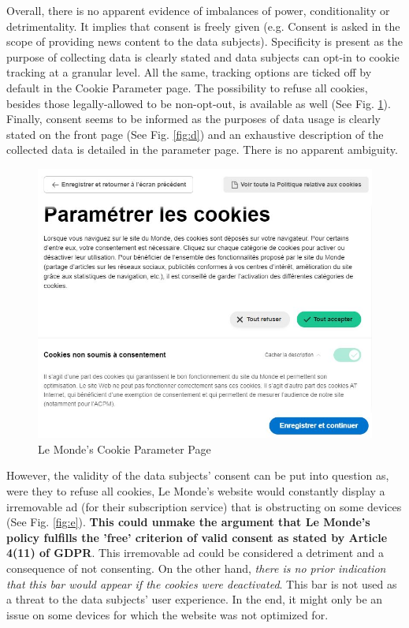 \documentclass[twocolumn, letterpaper]{scrartcl}
\begin{document}
    	Overall, there is no apparent evidence of imbalances of power, conditionality or detrimentality. It implies that consent is freely given (e.g. Consent is asked in the scope of providing news content to the data subjects). Specificity is present as the purpose of collecting data is clearly stated and data subjects can opt-in to cookie tracking at a granular level. All the same, tracking options are ticked off by default in the Cookie Parameter page. The possibility to refuse all cookies, besides those legally-allowed to be non-opt-out, is available as well (See Fig. \ref{fig:c}). Finally, consent seems to be informed as the purposes of data usage is clearly stated on the front page (See Fig. \ref{fig:d}) and an exhaustive description of the collected data is detailed in the parameter page. There is no apparent ambiguity.
    	
    	\begin{figure}[tbp]	
            \includegraphics[width=0.9\linewidth]{lm_cn.JPG}
            \caption{Le Monde's Cookie Parameter Page \label{fig:c}}
        \end{figure}
        
    	However, the validity of the data subjects' consent can be put into question as, were they to refuse all cookies, Le Monde's website would constantly display a irremovable ad (for their subscription service) that is obstructing on some devices (See Fig. \ref{fig:e}). \textbf{This could unmake the argument that Le Monde's policy fulfills the 'free' criterion of valid consent as stated by Article 4(11) of GDPR}. This irremovable ad could be considered a detriment and a consequence of not consenting. On the other hand, \textit{there is no prior indication that this bar would appear if the cookies were deactivated}. This bar is not used as a threat to the data subjects' user experience. In the end, it might only be an issue on some devices for which the website was not optimized for. 
    	
\end{document}
